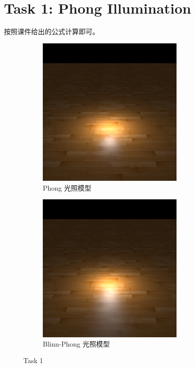 \documentclass[UTF8]{ctexart}
\begin{document}
\section*{Task 1: Phong Illumination}

按照课件给出的公式计算即可。

\begin{figure}[htbp]
    \hfill
    \begin{subfigure}[b]{0.49\textwidth}
        \centering
        \includegraphics[width=0.8\textwidth]{images/1-1.png}
        \caption{Phong 光照模型}
    \end{subfigure}
    \hfill
    \begin{subfigure}[b]{0.49\textwidth}
        \centering
        \includegraphics[width=0.8\textwidth]{images/1-2.png}
        \caption{Blinn-Phong 光照模型}
    \end{subfigure}
    \hfill
    \caption*{Task 1}
\end{figure}
\end{document}
